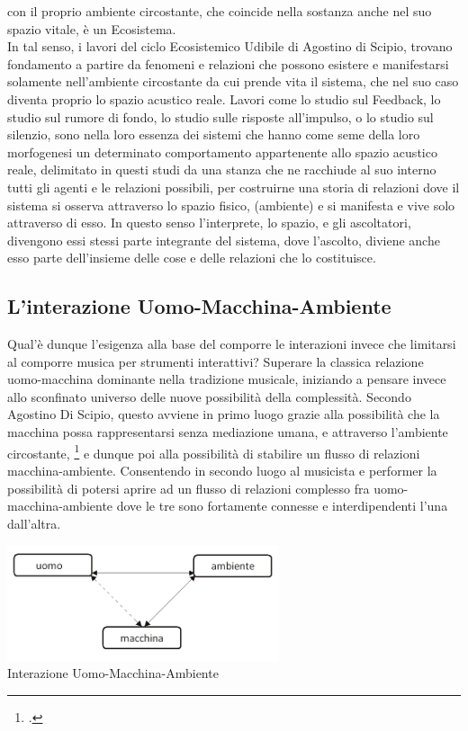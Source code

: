 con il proprio ambiente circostante, che coincide nella sostanza anche nel suo spazio vitale, è un Ecosistema. \\
In tal senso, i lavori del ciclo Ecosistemico Udibile di Agostino di Scipio, 
trovano fondamento a partire da fenomeni e relazioni che possono esistere e manifestarsi solamente nell'ambiente 
circostante da cui prende vita il sistema, 
che nel suo caso diventa proprio lo spazio acustico reale. 
Lavori come lo studio sul Feedback, lo studio sul rumore di fondo, lo studio sulle risposte all'impulso, o
lo studio sul silenzio, sono nella loro essenza dei sistemi che hanno come seme 
della loro morfogenesi un determinato 
comportamento appartenente allo spazio acustico reale, delimitato in questi studi da una stanza
che ne racchiude al suo interno tutti gli agenti e le relazioni possibili,
per costruirne una storia di relazioni dove il sistema si osserva attraverso lo spazio fisico, 
(ambiente) e si manifesta e vive solo attraverso di esso.
In questo senso l’interprete, lo spazio, e gli ascoltatori, 
divengono essi stessi parte integrante del sistema, dove l’ascolto, diviene anche esso
parte dell’insieme delle cose e delle relazioni che lo costituisce. \\

\subsection{L'interazione Uomo-Macchina-Ambiente}
\label{sec:L'interazione Uomo-Macchina-Ambiente}

Qual'è dunque l'esigenza alla base del comporre le interazioni invece 
che limitarsi al comporre musica per strumenti interattivi? 
Superare la classica relazione uomo-macchina dominante nella tradizione musicale, 
iniziando a pensare invece allo sconfinato universo delle nuove possibilità della complessità.
Secondo Agostino Di Scipio, questo avviene in primo luogo grazie 
alla possibilità che la macchina possa rappresentarsi
senza mediazione umana, e attraverso l'ambiente circostante, \footcite{discipio_polverisonore_2016}
e dunque poi alla possibilità di stabilire un flusso di relazioni macchina-ambiente. 
Consentendo in secondo luogo al musicista e performer 
la possibilità di potersi aprire ad un flusso di relazioni 
complesso fra uomo-macchina-ambiente dove le tre sono fortamente connesse e interdipendenti 
l'una dall'altra.

\begin{center}
\vspace{0.5cm}
\includegraphics[width=8cm]{figures/uomo_macchina_ambiente.png} \\
{Interazione Uomo-Macchina-Ambiente} \\ 
\vspace{0.5cm}
\end{center}

